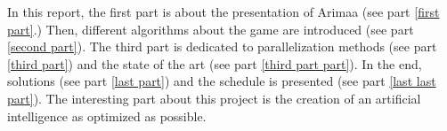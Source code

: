 In this report, the first part is about the presentation of Arimaa (see part \ref{first part}.) Then, different algorithms about the game are introduced (see part \ref{second part}). The third part is dedicated to parallelization methods (see part \ref{third part}) and the state of the art (see part \ref{third part part}). In the end, solutions (see part \ref{last part}) and the schedule is presented (see part \ref{last last part}).
The interesting part about this project is the creation of an artificial intelligence as optimized as possible.